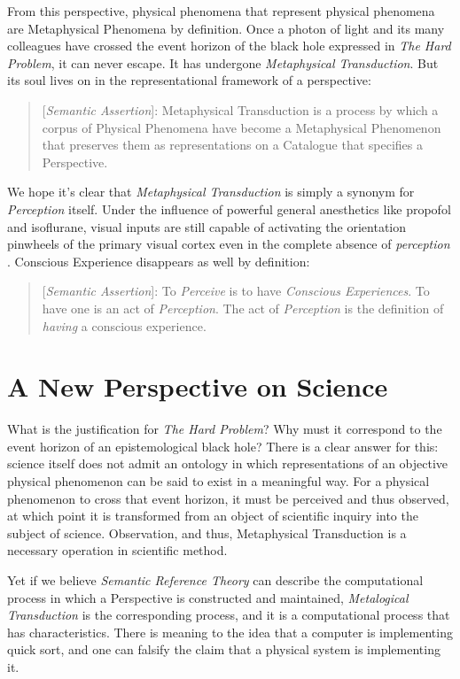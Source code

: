 \documentclass[runningheads]{llncs}
\begin{document}
From this perspective, physical phenomena that represent physical phenomena are Metaphysical Phenomena by definition. Once a photon of light and its many colleagues have crossed the event horizon of the black hole expressed in \emph{The Hard Problem}, it can never escape. It has undergone \emph{Metaphysical Transduction}. But its soul lives on in the representational framework of a perspective:

\begin{quote}
[\emph{Semantic Assertion}]: Metaphysical Transduction is a process by which a corpus of Physical Phenomena have become a Metaphysical Phenomenon that preserves them as representations on a Catalogue that specifies a Perspective.
\end{quote}

We hope it's clear that \emph{Metaphysical Transduction} is simply a synonym for \emph{Perception} itself. Under the influence of powerful general anesthetics like propofol and isoflurane, visual inputs are still capable of activating the orientation pinwheels of the primary visual cortex even in the complete absence of \emph{perception}\cite{Bugrova2020} \cite{Khan2024}. Conscious Experience disappears as well by definition:

\begin{quote}
[\emph{Semantic Assertion}]: To \emph{Perceive} is to have \emph{Conscious Experiences}. To have one is an act of \emph{Perception}. The act of \emph{Perception} is the definition of \emph{having} a conscious experience.
\end{quote}

\section{A New Perspective on Science}

What is the justification for \emph{The Hard Problem}? Why must it correspond to the event horizon of an epistemological black hole? There is a clear answer for this: science itself does not admit an ontology in which representations of an objective physical phenomenon can be said to exist in a meaningful way. For a physical phenomenon to cross that event horizon, it must be perceived and thus observed, at which point it is transformed from an object of scientific inquiry into the subject of science. Observation, and thus, Metaphysical Transduction is a necessary operation in scientific method\cite{Popper1959}.

Yet if we believe \emph{Semantic Reference Theory} can describe the computational process in which a Perspective is constructed and maintained, \emph{Metalogical Transduction} is the corresponding process, and it is a computational process that has characteristics. There is meaning to the idea that a computer is implementing quick sort, and one can falsify the claim that a physical system is implementing it.
\end{document}
